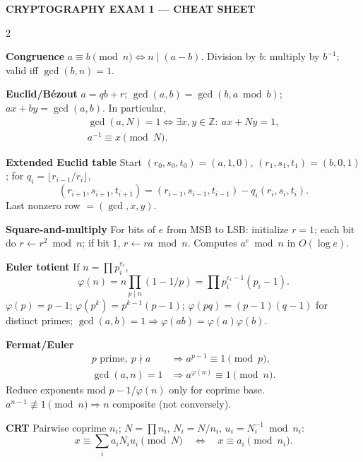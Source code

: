 \documentclass[8pt,a4paper]{extarticle}
\newcommand{\sect}[1]{\vspace{4pt plus 5pt}{\bfseries\rule{\linewidth}{0.2pt}\par\vspace{-1.8pt}#1}\par\vspace{-0.2pt}}
\newcommand{\sub}[1]{\vspace{0.5pt plus 2pt}\textbf{#1}\;}
\newcommand{\Z}{\mathbb Z}
\begin{document}
\fontsize{10}{11.4}\selectfont
\setlength{\abovedisplayskip}{3pt plus 1.5pt}\setlength{\belowdisplayskip}{3pt plus 1.5pt}
\setlength{\abovedisplayshortskip}{1pt plus 1pt}\setlength{\belowdisplayshortskip}{2pt plus 1pt}
\begin{center}
{\fontsize{12}{13}\selectfont\bfseries CRYPTOGRAPHY EXAM 1 --- CHEAT SHEET}
\end{center}
\vspace{-3pt}
\begin{multicols}{2}

\sect{MODULAR ARITHMETIC}
\sub{Congruence} $a\equiv b\pmod n\iff n\mid(a-b)$. Division by $b$: multiply by $b^{-1}$; valid iff $\gcd(b,n)=1$.

\sub{Euclid/B\'ezout}
$a=qb+r$; $\gcd(a,b)=\gcd(b,a\bmod b)$;
$ax+by=\gcd(a,b)$. In particular,
\[
\begin{gathered}
\boxed{\gcd(a,N)=1\iff\exists x,y\in\Z:\ ax+Ny=1},\\
a^{-1}\equiv x\pmod N.
\end{gathered}
\]

\sub{Extended Euclid table} Start $(r_0,s_0,t_0)=(a,1,0)$, $(r_1,s_1,t_1)=(b,0,1)$; for $q_i=\lfloor r_{i-1}/r_i\rfloor$,
\[
(r_{i+1},s_{i+1},t_{i+1})=(r_{i-1},s_{i-1},t_{i-1})-q_i(r_i,s_i,t_i).
\]
Last nonzero row $=(\gcd,x,y)$.

\sub{Square-and-multiply} For bits of $e$ from MSB to LSB: initialize $r=1$; each bit do $r\leftarrow r^2\bmod n$; if bit $1$, $r\leftarrow ra\bmod n$. Computes $a^e\bmod n$ in $O(\log e)$.

\sub{Euler totient} If $n=\prod p_i^{e_i}$,
\[
\boxed{\varphi(n)=n\prod_{p\mid n}(1-1/p)=\prod p_i^{e_i-1}(p_i-1)}.
\]
$\varphi(p)=p-1$; $\varphi(p^k)=p^{k-1}(p-1)$;
$\boxed{\varphi(pq)=(p-1)(q-1)}$ for distinct primes;
$\gcd(a,b)=1\Rightarrow\varphi(ab)=\varphi(a)\varphi(b)$.

\sub{Fermat/Euler}
\[
\begin{aligned}
p\text{ prime},\ p\nmid a&\Rightarrow a^{p-1}\equiv1\pmod p,\\
\gcd(a,n)=1&\Rightarrow a^{\varphi(n)}\equiv1\pmod n.
\end{aligned}
\]
Reduce exponents mod $p-1$/$\varphi(n)$ only for coprime base. $a^{n-1}\not\equiv1\pmod n\Rightarrow n$ composite (not conversely).

\sub{CRT} Pairwise coprime $n_i$; $N=\prod n_i$, $N_i=N/n_i$, $u_i=N_i^{-1}\bmod n_i$:
\[
\boxed{x\equiv\sum_i a_iN_iu_i\pmod N}\quad\Longleftrightarrow\quad x\equiv a_i\pmod{n_i}.
\]


\end{multicols}
\end{document}
